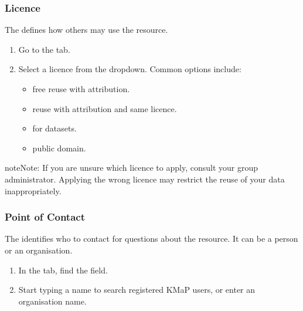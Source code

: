 \documentclass[letterpaper,10pt,english]{sphinxmanual}
\begin{document}
\subsubsection{Licence}
\label{\detokenize{en/03_managing_metadata:licence}}
\sphinxAtStartPar
The  defines how others may use the resource.
\begin{enumerate}
%
\item {} 
\sphinxAtStartPar
Go to the  tab.

\item {} 
\sphinxAtStartPar
Select a licence from the dropdown. Common options include:
\begin{itemize}
\item {} 
\sphinxAtStartPar
{} \textendash{} free reuse with attribution.

\item {} 
\sphinxAtStartPar
{} \textendash{} reuse with attribution and
same licence.

\item {} 
\sphinxAtStartPar
{} \textendash{} for datasets.

\item {} 
\sphinxAtStartPar
{} \textendash{} public domain.

\end{itemize}

\end{enumerate}

\begin{sphinxadmonition}{note}{Note:}
\sphinxAtStartPar
If you are unsure which licence to apply, consult your group administrator. Applying
the wrong licence may restrict the reuse of your data inappropriately.
\end{sphinxadmonition}


\subsubsection{Point of Contact}
\label{\detokenize{en/03_managing_metadata:point-of-contact}}
\sphinxAtStartPar
The  identifies who to contact for questions about the resource.
It can be a person or an organisation.
\begin{enumerate}
%
\item {} 
\sphinxAtStartPar
In the  tab, find the  field.

\item {} 
\sphinxAtStartPar
Start typing a name to search registered KMaP users, or enter an organisation name.

\end{enumerate}
\end{document}
